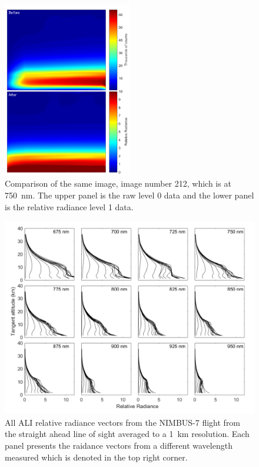 \documentclass[12pt]{article}
\begin{document}
\begin{figure}
\includegraphics[width=0.5\textwidth]{./Images/5-2-BeforeAfterImage.pdf}
    \caption{Comparison of the same image, image number 212, which is at 750~nm. The upper panel is the raw level 0 data and the lower panel is the relative radiance level 1 data.}
    \label{fig:BeforeAfterImages}
\end{figure}

\newpage

\begin{figure}
\includegraphics[width=1.0\textwidth]{./Images/5-2-AliRadianceVectors.pdf}
    \caption{All ALI relative radiance vectors from the NIMBUS-7 flight from the straight ahead line of sight averaged to a 1~km resolution. Each panel presents the raidance vectors from a different wavelength measured which is denoted in the top right corner. }
    \label{fig:AliRadiancesVectors}
\end{figure}
\end{document}
